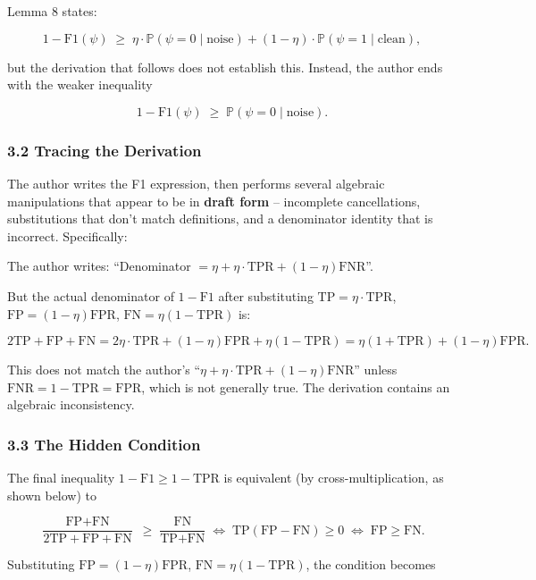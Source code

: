 \documentclass[
  12pt,
]{article}
\begin{document}
Lemma 8 states:

\[1 - \text{F1}(\psi) \;\geq\; \eta \cdot \mathbb{P}(\psi=0 \mid \text{noise}) + (1-\eta) \cdot \mathbb{P}(\psi=1 \mid \text{clean}),\]

but the derivation that follows does not establish this. Instead, the
author ends with the weaker inequality

\[1 - \text{F1}(\psi) \;\geq\; \mathbb{P}(\psi=0 \mid \text{noise}).\]

\subsubsection{3.2 Tracing the Derivation}\label{tracing-the-derivation}

The author writes the F1 expression, then performs several algebraic
manipulations that appear to be in \textbf{draft form} -- incomplete
cancellations, substitutions that don't match definitions, and a
denominator identity that is incorrect. Specifically:

The author writes: ``Denominator
\(= \eta + \eta\cdot\text{TPR} + (1-\eta)\text{FNR}\)''.

But the actual denominator of \(1-\text{F1}\) after substituting
\(\text{TP} = \eta\cdot\text{TPR}\), \(\text{FP} = (1-\eta)\text{FPR}\),
\(\text{FN} = \eta(1-\text{TPR})\) is:

\[2\text{TP} + \text{FP} + \text{FN} = 2\eta\cdot\text{TPR} + (1-\eta)\text{FPR} + \eta(1-\text{TPR}) = \eta(1+\text{TPR}) + (1-\eta)\text{FPR}.\]

This does not match the author's
``\(\eta + \eta\cdot\text{TPR} + (1-\eta)\text{FNR}\)'' unless
\(\text{FNR} = 1-\text{TPR} = \text{FPR}\), which is not generally true.
The derivation contains an algebraic inconsistency.

\subsubsection{3.3 The Hidden Condition}\label{the-hidden-condition}

The final inequality \(1-\text{F1} \geq 1-\text{TPR}\) is equivalent (by
cross-multiplication, as shown below) to

\[\frac{\text{FP}+\text{FN}}{2\text{TP}+\text{FP}+\text{FN}} \;\geq\; \frac{\text{FN}}{\text{TP}+\text{FN}} \;\iff\; \text{TP}(\text{FP} - \text{FN}) \geq 0 \;\iff\; \text{FP} \geq \text{FN}.\]

Substituting \(\text{FP} = (1-\eta)\text{FPR}\),
\(\text{FN} = \eta(1-\text{TPR})\), the condition becomes
\end{document}
